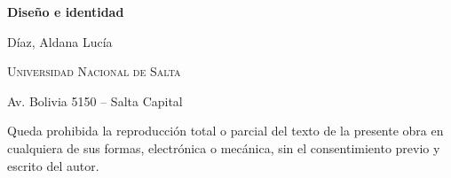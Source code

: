 \begin{center}
	\sffamily \Large \bfseries Diseño e identidad
	
	\large \normalfont
	Díaz, Aldana Lucía
\end{center}

\vspace*{2.5mm}

\begin{center}
	\scshape \Large Universidad Nacional de Salta
	
	\normalfont \normalsize
	Av. Bolivia 5150 -- Salta Capital
\end{center}

\vfill

\begin{center}
	\footnotesize
	Queda prohibida la reproducción total o parcial del texto de la presente obra en cualquiera de sus formas, electrónica o mecánica, sin el consentimiento previo y escrito del autor.
\end{center}
